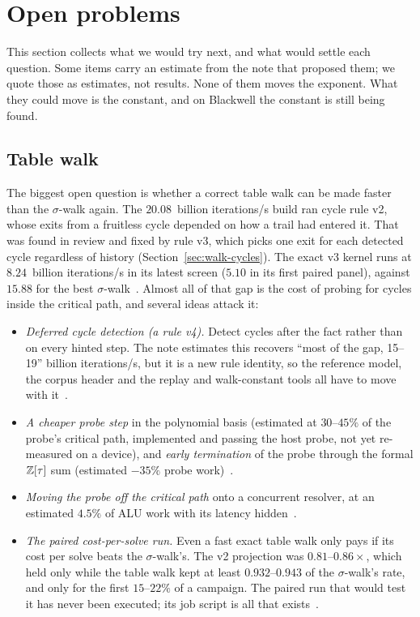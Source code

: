 \section{Open problems}
\label{sec:open}

This section collects what we would try next, and what would settle
each question. Some items carry an estimate from the note that
proposed them; we quote those as estimates, not results. None of them
moves the exponent. What they could move is the constant, and on
Blackwell the constant is still being found.

\subsection{Table walk}
\label{sec:open-table}

The biggest open question is whether a correct table walk can be made
faster than the $\sigma$-walk again. The $20.08$~billion iterations/s
build ran cycle rule v2, whose exits from a fruitless cycle depended on
how a trail had entered it. That was found in review and fixed by rule
v3, which picks one exit for each detected cycle regardless of
history (Section~\ref{sec:walk-cycles}). The exact v3 kernel runs at
$8.24$~billion iterations/s in its latest screen ($5.10$ in its first
paired panel), against $15.88$ for the best
$\sigma$-walk~.
Almost all of that gap is the cost of probing for cycles inside the
critical path, and several ideas attack it:
\begin{itemize}[leftmargin=1.2em,itemsep=0.2em]
\item \emph{Deferred cycle detection (a rule v4).} Detect cycles after
  the fact rather than on every hinted step. The note estimates this
  recovers ``most of the gap, 15--19'' billion iterations/s, but it is
  a new rule identity, so the reference model, the corpus header and
  the replay and walk-constant tools all have to move with
  it~.
\item \emph{A cheaper probe step} in the polynomial basis (estimated at
  $30$--$45\%$ of the probe's critical path, implemented and passing the
  host probe, not yet re-measured on a device), and \emph{early
  termination} of the probe through the formal $\mathbb{Z}[\tau]$ sum
  (estimated $-35\%$ probe work)~.
\item \emph{Moving the probe off the critical path} onto a concurrent
  resolver, at an estimated $4.5\%$ of ALU work with its latency
  hidden~.
\item \emph{The paired cost-per-solve run.} Even a fast exact table
  walk only pays if its cost per solve beats the $\sigma$-walk's. The
  v2 projection was $0.81$--$0.86\times$, which held only while the table
  walk kept at least $0.932$--$0.943$ of the $\sigma$-walk's rate, and
  only for the first $15$--$22\%$ of a campaign. The paired run that would
  test it has never been executed; its job script is all that
  exists~.
\end{itemize}

